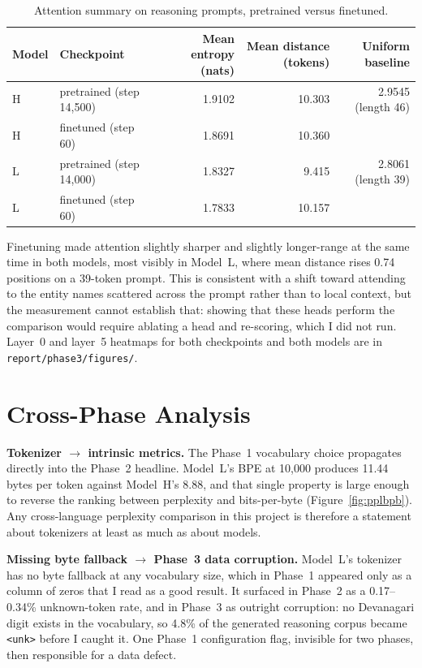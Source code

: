 \documentclass[10pt]{article}
\begin{document}
\begin{table}[!htb]
\centering\small
\caption{Attention summary on reasoning prompts, pretrained versus finetuned.}
\label{tab:attncompare}
\begin{tabular}{llrrr}
\toprule
Model & Checkpoint & Mean entropy (nats) & Mean distance (tokens) & Uniform baseline \\
\midrule
H & pretrained (step 14{,}500) & 1.9102 & 10.303 & 2.9545 (length 46) \\
H & finetuned (step 60) & 1.8691 & 10.360 & \\
L & pretrained (step 14{,}000) & 1.8327 & 9.415 & 2.8061 (length 39) \\
L & finetuned (step 60) & 1.7833 & 10.157 & \\
\bottomrule
\end{tabular}
\end{table}

Finetuning made attention slightly sharper and slightly longer-range at the same time
in both models, most visibly in Model~L, where mean distance rises 0.74 positions on a
39-token prompt. This is consistent with a shift toward attending to the entity names
scattered across the prompt rather than to local context, but the measurement cannot
establish that: showing that these heads perform the comparison would require
ablating a head and re-scoring, which I did not run. Layer~0 and layer~5 heatmaps for
both checkpoints and both models are in \texttt{report/phase3/figures/}.

\section{Cross-Phase Analysis}
\label{sec:cross}

\textbf{Tokenizer $\rightarrow$ intrinsic metrics.} The Phase~1 vocabulary choice
propagates directly into the Phase~2 headline. Model~L's BPE at 10{,}000 produces
11.44 bytes per token against Model~H's 8.88, and that single property is large
enough to reverse the ranking between perplexity and bits-per-byte
(Figure~\ref{fig:pplbpb}). Any cross-language perplexity comparison in this project
is therefore a statement about tokenizers at least as much as about models.

\textbf{Missing byte fallback $\rightarrow$ Phase~3 data corruption.} Model~L's
tokenizer has no byte fallback at any vocabulary size, which in Phase~1 appeared only
as a column of zeros that I read as a good result. It surfaced in Phase~2 as a
0.17--0.34\% unknown-token rate, and in Phase~3 as outright corruption: no Devanagari
digit exists in the vocabulary, so 4.8\% of the generated reasoning corpus became
\texttt{<unk>} before I caught it. One Phase~1 configuration flag, invisible for two
phases, then responsible for a data defect.
\end{document}
